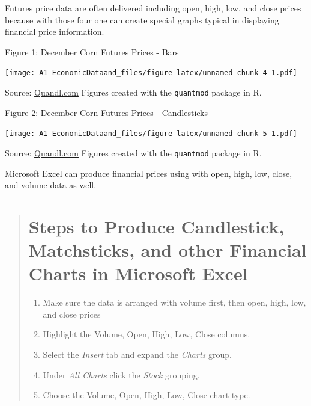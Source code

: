 \documentclass[]{book}
\providecommand{\tightlist}{%
  \setlength{\itemsep}{0pt}\setlength{\parskip}{0pt}}
\theoremstyle{definition}
\theoremstyle{definition}
\theoremstyle{remark}
\begin{document}
Futures price data are often delivered including open, high, low, and
close prices because with those four one can create special graphs
typical in displaying financial price information.

Figure 1: December Corn Futures Prices - Bars

\texttt{[image: A1-EconomicDataand\_files/figure-latex/unnamed-chunk-4-1.pdf]}

Source:
\href{https://www.quandl.com/data/CME/CZ2015-Corn-Futures-December-2015-CZ2015}{Quandl.com}
Figures created with the \texttt{quantmod} package in R.

Figure 2: December Corn Futures Prices - Candlesticks

\texttt{[image: A1-EconomicDataand\_files/figure-latex/unnamed-chunk-5-1.pdf]}

Source:
\href{https://www.quandl.com/data/CME/CZ2015-Corn-Futures-December-2015-CZ2015}{Quandl.com}
Figures created with the \texttt{quantmod} package in R.

Microsoft Excel can produce financial prices using with open, high, low,
close, and volume data as well.

\begin{quote}
\section{Steps to Produce Candlestick, Matchsticks, and other Financial
Charts in Microsoft
Excel}\label{steps-to-produce-candlestick-matchsticks-and-other-financial-charts-in-microsoft-excel}

\begin{enumerate}
\def\labelenumi{\arabic{enumi}.}
\tightlist
\item
  Make sure the data is arranged with volume first, then open, high,
  low, and close prices
\item
  Highlight the Volume, Open, High, Low, Close columns.
\item
  Select the \emph{Insert} tab and expand the \emph{Charts} group.
\item
  Under \emph{All Charts} click the \emph{Stock} grouping.
\item
  Choose the Volume, Open, High, Low, Close chart type.
\end{enumerate}
\end{quote}
\end{document}
